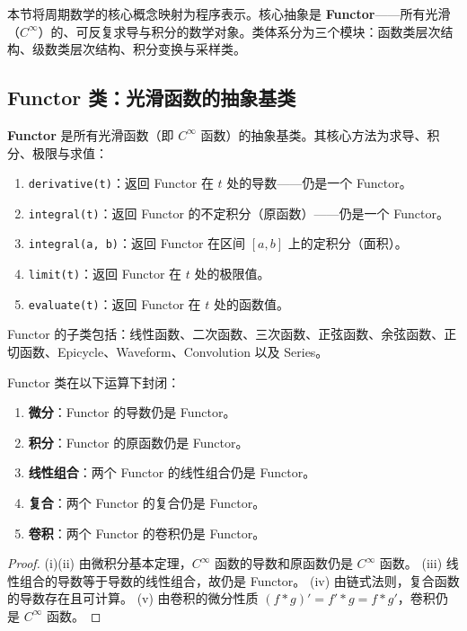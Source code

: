 本节将周期数学的核心概念映射为程序表示。核心抽象是 \textbf{Functor}——所有光滑（$C^\infty$）的、可反复求导与积分的数学对象。类体系分为三个模块：函数类层次结构、级数类层次结构、积分变换与采样类。

\subsection{Functor 类：光滑函数的抽象基类}

\begin{definition}[Functor 类]\label{def:functor_class}
\textbf{Functor} 是所有光滑函数（即 $C^\infty$ 函数）的抽象基类。其核心方法为求导、积分、极限与求值：
\begin{enumerate}[label=(\roman*)]
    \item \texttt{derivative(t)}：返回 Functor 在 $t$ 处的导数——仍是一个 Functor。
    \item \texttt{integral(t)}：返回 Functor 的不定积分（原函数）——仍是一个 Functor。
    \item \texttt{integral(a, b)}：返回 Functor 在区间 $[a,b]$ 上的定积分（面积）。
    \item \texttt{limit(t)}：返回 Functor 在 $t$ 处的极限值。
    \item \texttt{evaluate(t)}：返回 Functor 在 $t$ 处的函数值。
\end{enumerate}
Functor 的子类包括：线性函数、二次函数、三次函数、正弦函数、余弦函数、正切函数、Epicycle、Waveform、Convolution 以及 Series。
\end{definition}

\begin{property}\label{prop:functor_closure}
Functor 类在以下运算下封闭：
\begin{enumerate}[label=(\roman*)]
    \item \textbf{微分}：Functor 的导数仍是 Functor。
    \item \textbf{积分}：Functor 的原函数仍是 Functor。
    \item \textbf{线性组合}：两个 Functor 的线性组合仍是 Functor。
    \item \textbf{复合}：两个 Functor 的复合仍是 Functor。
    \item \textbf{卷积}：两个 Functor 的卷积仍是 Functor。
\end{enumerate}
\end{property}

\begin{proof}
(i)(ii) 由微积分基本定理，$C^\infty$ 函数的导数和原函数仍是 $C^\infty$ 函数。
(iii) 线性组合的导数等于导数的线性组合，故仍是 Functor。
(iv) 由链式法则，复合函数的导数存在且可计算。
(v) 由卷积的微分性质 $(f * g)' = f' * g = f * g'$，卷积仍是 $C^\infty$ 函数。
\end{proof}

